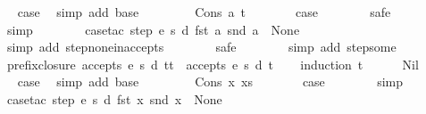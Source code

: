 \begin{isabellebody}
\ \isamarkupfalse%
\ {\isacharquery}case\ \isamarkupfalse%
\ {\isacharparenleft}simp\ add{\isacharcolon}\ base{\isacharparenright}\isanewline
\ \ \isamarkupfalse%
\isanewline
\ \ \ \ \isamarkupfalse%
\ {\isacharparenleft}Cons\ a\ t{\isacharparenright}\isanewline
\ \ \ \ \isamarkupfalse%
\ \isamarkupfalse%
\ {\isacharquery}case\isanewline
\ \ \ \ \ \ \isamarkupfalse%
\ safe\isanewline
\ \ \ \ \ \ \isamarkupfalse%
\ simp\isanewline
\ \ \ \ \ \ \isamarkupfalse%
\ {\isacharparenleft}case{\isacharunderscore}tac\ {\isachardoublequoteopen}step\ e\ s\ d\ {\isacharparenleft}fst\ a{\isacharparenright}\ {\isacharparenleft}snd\ a{\isacharparenright}\ {\isacharequal}\ None{\isachardoublequoteclose}{\isacharparenright}\isanewline
\ \ \ \ \ \ \ \isamarkupfalse%
\ {\isacharparenleft}simp\ add{\isacharcolon}\ step{\isacharunderscore}none{\isacharunderscore}inaccepts{\isacharparenright}\isanewline
\ \ \ \ \ \ \isamarkupfalse%
\ safe\isanewline
\ \ \ \ \ \ \isamarkupfalse%
\ {\isacharparenleft}simp\ add{\isacharcolon}\ step{\isacharunderscore}some{\isacharparenright}\isanewline
\ \ \isamarkupfalse%
%
\endisatagproof
{\isafoldproof}%
%
\isadelimproof
\isanewline
%
\endisadelimproof
\isanewline
{}\isamarkupfalse%
\ prefix{\isacharunderscore}closure{\isacharcolon}\ {\isachardoublequoteopen}accepts\ e\ s\ d\ {\isacharparenleft}t{\isacharat}t{\isacharprime}{\isacharparenright}\ {\isasymLongrightarrow}\ accepts\ e\ s\ d\ t{\isachardoublequoteclose}\isanewline
%
\isadelimproof
\ \ %
\endisadelimproof
%
\isatagproof
{}\isamarkupfalse%
\ {\isacharparenleft}induction\ {\isachardoublequoteopen}t{\isachardoublequoteclose}{\isacharparenright}\isanewline
\ \ \ \ \isamarkupfalse%
\ Nil\isanewline
\ \ \ \ \isamarkupfalse%
\ \isamarkupfalse%
\ {\isacharquery}case\ \isamarkupfalse%
\ {\isacharparenleft}simp\ add{\isacharcolon}\ base{\isacharparenright}\isanewline
\ \ \isamarkupfalse%
\isanewline
\ \ \ \ \isamarkupfalse%
\ {\isacharparenleft}Cons\ x\ xs{\isacharparenright}\isanewline
\ \ \ \ \isamarkupfalse%
\ \isamarkupfalse%
\ {\isacharquery}case\isanewline
\ \ \ \ \ \ \isamarkupfalse%
\ simp\isanewline
\ \ \ \ \ \ \isamarkupfalse%
\ {\isacharparenleft}case{\isacharunderscore}tac\ {\isachardoublequoteopen}step\ e\ s\ d\ {\isacharparenleft}fst\ x{\isacharparenright}\ {\isacharparenleft}snd\ x{\isacharparenright}\ {\isacharequal}\ None{\isachardoublequoteclose}{\isacharparenright}\isanewline

\end{isabellebody}

